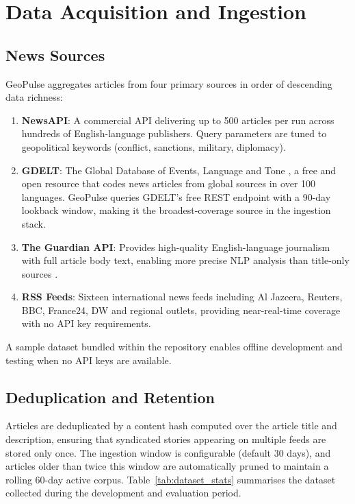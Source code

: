 \documentclass[12pt,a4paper]{report}
\begin{document}
\section{Data Acquisition and Ingestion}

\subsection{News Sources}

GeoPulse aggregates articles from four primary sources in order of
descending data richness:

\begin{enumerate}
  \item \textbf{NewsAPI}: A commercial API delivering up to 500 articles
        per run across hundreds of English-language publishers. Query
        parameters are tuned to geopolitical keywords (conflict, sanctions,
        military, diplomacy).
  \item \textbf{GDELT}: The Global Database of Events, Language and Tone
        \cite{leetaru2013}, a free and open resource that codes news articles
        from global sources in over 100 languages. GeoPulse queries
        GDELT's free REST endpoint with a 90-day lookback window, making it
        the broadest-coverage source in the ingestion stack.
  \item \textbf{The Guardian API}: Provides high-quality English-language
        journalism with full article body text, enabling more precise NLP
        analysis than title-only sources \cite{nassirtoussi2014}.
  \item \textbf{RSS Feeds}: Sixteen international news feeds including
        Al Jazeera, Reuters, BBC, France24, DW and regional outlets,
        providing near-real-time coverage with no API key requirements.
\end{enumerate}

A sample dataset bundled within the repository enables offline development
and testing when no API keys are available.

\subsection{Deduplication and Retention}

Articles are deduplicated by a content hash computed over the article title
and description, ensuring that syndicated stories appearing on multiple feeds
are stored only once. The ingestion window is configurable (default 30 days),
and articles older than twice this window are automatically pruned to maintain
a rolling 60-day active corpus. Table~\ref{tab:dataset_stats} summarises the
dataset collected during the development and evaluation period.
\end{document}
